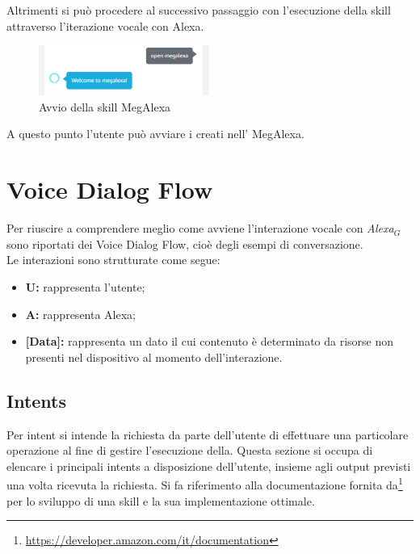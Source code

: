 \begin{itemize}
Altrimenti si può procedere al successivo passaggio con l'esecuzione della skill attraverso l'iterazione vocale con Alexa. \\

\begin{figure}[!ht]
	\centering
	\includegraphics[width=0.5\textwidth]{images/OpenMegAlexa.png}
	\caption{Avvio della skill MegAlexa}
\end{figure}

\end{itemize}

A questo punto l'utente può avviare i  creati nell' MegAlexa.\\

\newpage
\section{Voice Dialog Flow}
\label{VDF}
Per riuscire a comprendere meglio come avviene l'interazione vocale con \textit{Alexa$_{G}$} sono riportati dei Voice Dialog Flow, cioè degli esempi di conversazione.\\

Le interazioni sono strutturate come segue:
\begin{itemize}
	\item \textbf{U:} rappresenta l'utente;
	\item \textbf{A:} rappresenta Alexa;
	\item \textbf{[Data]:} rappresenta un dato il cui contenuto è determinato da risorse non presenti nel dispositivo al momento dell'interazione.
\end{itemize}

\subsection{Intents}
Per intent si intende la richiesta da parte dell'utente di effettuare una particolare operazione al fine di gestire l'esecuzione della. 
Questa sezione si occupa di elencare i principali intents a disposizione dell'utente, insieme agli output previsti una volta ricevuta la richiesta.
Si fa riferimento alla documentazione fornita da\footnote{\url{https://developer.amazon.com/it/documentation}} per lo sviluppo di una skill e la sua implementazione ottimale.

